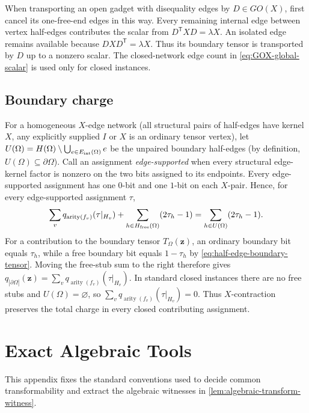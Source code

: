\documentclass[11pt,letterpaper,onecolumn]{article}
\theoremstyle{plain}
\theoremstyle{definition}
\theoremstyle{remark}
\newcommand{\arity}{\operatorname{arity}}
\begin{document}
When transporting an open gadget with disequality edges by \(D\in GO(X)\), first cancel
its one-free-end edges in this way.  Every remaining internal edge between
vertex half-edges contributes the scalar from \(D^{\mathsf T}XD=\lambda X\).
An isolated edge remains available because \(DXD^{\mathsf T}=\lambda X\).
Thus its boundary tensor is transported by \(D\) up to a nonzero scalar. The closed-network edge count in \cref{eq:GOX-global-scalar} is used
only for closed instances.

\subsection{Boundary charge}
\label{app:boundary-charge}
For a homogeneous \(X\)-edge network (all structural pairs of half-edges have
kernel \(X\), any explicitly supplied \(I\) or \(X\) is an ordinary tensor
vertex), let
\(U(\Omega)=H(\Omega)\setminus\bigcup_{e\in E_{\rm int}(\Omega)}e\) be the
unpaired boundary half-edges (by definition,
\(U(\Omega)\subseteq\partial\Omega\)).  Call an assignment
\emph{edge-supported} when every structural edge-kernel factor is nonzero on
the two bits assigned to its endpoints.  Every edge-supported assignment has
one \(0\)-bit and one \(1\)-bit on each
\(X\)-pair. Hence, for every edge-supported assignment \(\tau\),
\begin{equation*}
  \sum_v q_{\arity(f_v)}(\tau|_{H_v})
  +\sum_{h\in H_{\rm free}(\Omega)}(2\tau_h-1)
  =\sum_{h\in U(\Omega)}(2\tau_h-1).
\end{equation*}
For a contribution to the boundary tensor \(T_\Omega({\mathbf{z}})\), an ordinary
boundary bit equals \(\tau_h\), while a free boundary bit equals
\(1-\tau_h\) by \cref{eq:half-edge-boundary-tensor}.  Moving the free-stub
sum to the right therefore gives
\(q_{|\partial\Omega|}({\mathbf{z}})=\sum_v q_{\arity(f_v)}(\tau|_{H_v})\).
In standard closed instances there are
no free stubs and \(U(\Omega)=\varnothing\), so
\(\sum_vq_{\arity(f_v)}(\tau|_{H_v})=0\).  Thus \(X\)-contraction preserves
the total charge in every closed contributing assignment.


\section{Exact Algebraic Tools}
\label{app:exact-algebraic-tools}

This appendix fixes the standard conventions used to decide common
transformability and extract the algebraic witnesses in
\cref{lem:algebraic-transform-witness}.
\end{document}
